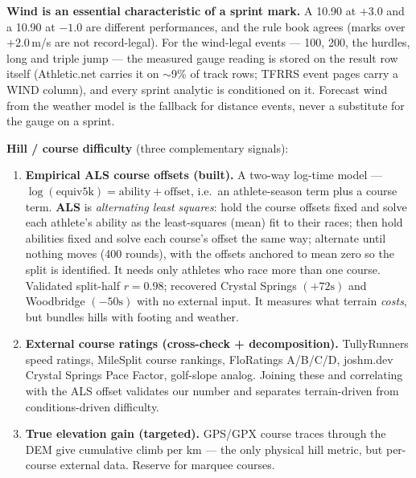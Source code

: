 \noindent\textbf{Wind is an essential characteristic of a sprint mark.} A 10.90
at $+3.0$ and a 10.90 at $-1.0$ are different performances, and the rule
book agrees (marks over $+2.0$\,m/s are not record-legal). For the wind-legal
events --- 100, 200, the hurdles, long and triple jump --- the measured
gauge reading is stored on the result row itself (Athletic.net carries it on
$\sim$9\% of track rows; TFRRS event pages carry a WIND column), and every
sprint analytic is conditioned on it. Forecast wind from the weather model is
the fallback for distance events, never a substitute for the gauge on a
sprint.

\noindent\textbf{Hill / course difficulty} (three complementary signals):
\begin{enumerate}
  \item \textbf{Empirical ALS course offsets (built).} A two-way log-time model
    --- \(\log(\mathrm{equiv5k}) = \mathrm{ability} + \mathrm{offset}\), i.e.\ an
    athlete-season term plus a course term. \textbf{ALS} is \emph{alternating
    least squares}: hold the course offsets fixed and solve each athlete's
    ability as the least-squares (mean) fit to their races; then hold
    abilities fixed and solve each course's offset the same way; alternate
    until nothing moves (400 rounds), with the offsets anchored to mean zero
    so the split is identified. It needs only athletes who race more than one
    course. Validated split-half \(r=0.98\); recovered Crystal Springs
    $(+72\text{s})$ and Woodbridge $(-50\text{s})$ with no external input. It
    measures what terrain \emph{costs}, but bundles hills with footing and
    weather.
  \item \textbf{External course ratings (cross-check + decomposition).}
    TullyRunners speed ratings, MileSplit course rankings, FloRatings A/B/C/D,
    joshm.dev Crystal Springs Pace Factor, golf-slope analog. Joining these and
    correlating with the ALS offset validates our number and separates
    terrain-driven from conditions-driven difficulty.
  \item \textbf{True elevation gain (targeted).} GPS/GPX course traces through
    the DEM give cumulative climb per km --- the only physical hill metric, but
    per-course external data. Reserve for marquee courses.
\end{enumerate}
